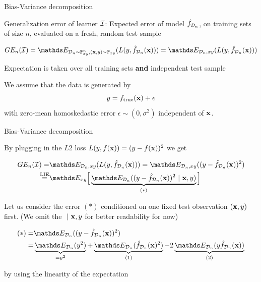 \documentclass[11pt,compress,t,notes=noshow, xcolor=table]{beamer}
\begin{document}

\begin{frame}{Bias-Variance decomposition}

Generalization error of learner  $\mathcal{I}$: 
Expected error of model $\hat{f}_{\mathcal{D}_n}$, on training sets of size $n$, evaluated on a fresh, random test sample

$$GE_n(\ind) = \E_{\D_n \sim \Pxy^n, (\xv, y) \sim \Pxy}( L(y, \fh_{\D_n}(\xv)) ) = \E_{\D_n, xy}( L(y, \fh_{\D_n}(\xv)) ) $$

\vfill 

Expectation is taken over all training sets \textbf{and} independent test sample\\

\vfill 

We assume that the data is generated by 
$$
y = f_{\text{true}}(\mathbf{x}) + \epsilon
$$
with zero-mean homoskedastic error $\epsilon \sim (0, \sigma^2)$ independent of $\mathbf{x}$. 

\end{frame}

\begin{framev}[fs=small]{Bias-Variance decomposition}

By plugging in the $L2$ loss $L(y, f(\mathbf{x})) = (y - f(\mathbf{x}))^2$ we get

\begin{align*}
GE_n(\ind) =& \E_{\D_n, xy}( L(y, \fh_{\D_n}(\xv))) = \E_{\D_n, xy}((y - \fh_{\D_n}(\xv))^2) \\
\stackrel{\text{LIE}}{=}& \E_{xy}\Big[\underbrace{\E_{\D_n}((y - \fh_{\D_n}(\xv))^2~|~ \xv, y)}_{(*)}\Big] 
\end{align*}

Let us consider the error $(*)$ conditioned on one fixed test observation $(\mathbf{x}, y)$ first. (We omit the $~|~\mathbf{x}, y$ for better readability for now)

\begin{align*}
(*) =& \E_{\D_n}((y - \fh_{\D_n}(\xv))^2)\\
=& \underbrace{\E_{\D_n}(y^2)}_{= y^2} + \underbrace{\E_{\D_n}(\fh_{\D_n}(\xv)^2)}_{(1)}  - 2\underbrace{\E_{\D_n}(y\fh_{\D_n}(\xv))}_{(2)} 
\end{align*}

by using the linearity of the expectation %

\end{framev}
\end{document}
